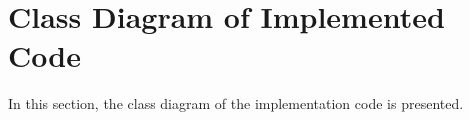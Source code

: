 \section{Class Diagram of Implemented Code}
In this section, the class diagram of the implementation code is presented.




